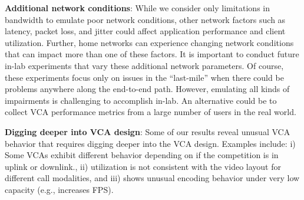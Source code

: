 \textbf{Additional network conditions}: While we consider only limitations in bandwidth to emulate poor network conditions, other network factors such as latency, packet loss, and jitter could affect application performance and client utilization. Further, home networks can experience changing network conditions that can impact more than one of these factors. It is important to conduct future in-lab experiments that vary these additional network parameters. Of course, these experiments focus only on issues in the ``last-mile'' when there could be problems anywhere along the end-to-end path. However, emulating all kinds of impairments is challenging to accomplish in-lab. An alternative could be to collect VCA performance metrics from a large number of users in the real world. 

\textbf{Digging deeper into VCA design}: Some of our results reveal unusual VCA behavior that requires digging deeper into the VCA design. Examples include: i) Some VCAs exhibit different behavior depending on if the competition is in uplink or downlink., ii) \teams utilization is not consistent with the video layout for different call modalities, and iii) \meet shows unusual encoding behavior under very low capacity (e.g., increases FPS).
